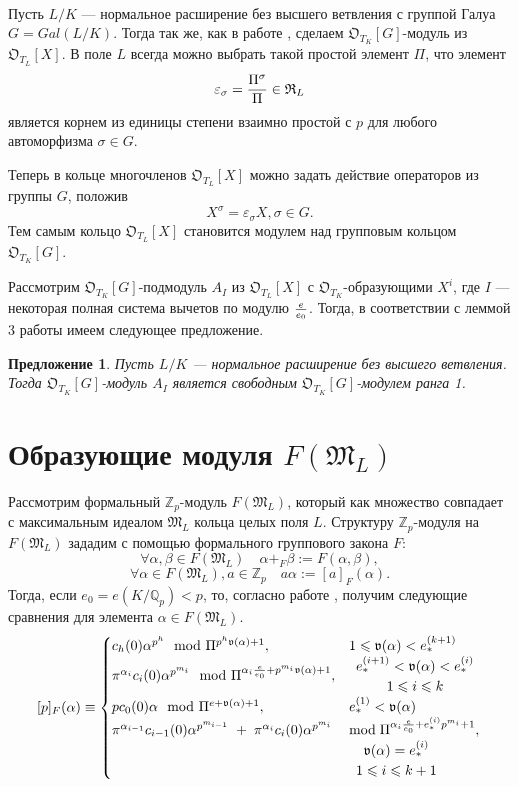 \documentclass[a4paper]{article}
\newcommand{\Qp}{\mathbb{Q}_p}
\newcommand{\ML}{\mathfrak{M}_L}
\newcommand{\OTK}{\mathfrak{O}_{T_K}}
\newcommand{\OTL}{\mathfrak{O}_{T_L}}
\newcommand{\RL}{\mathfrak{R}_L}
\newcommand{\val}{\mathfrak{v}}
\newcommand{\Leq}{\leqslant}
\newtheorem{proposition}{Предложение}
\begin{document}
\paragraph{}

Пусть $L/K$ --- нормальное расширение без высшего ветвления с группой Галуа $G=Gal(L/K)$. Тогда так же, как в работе \cite{book1}, сделаем $\OTK[G]$-модуль из $\OTL[X]$.  В поле $L$ всегда можно выбрать такой простой элемент $\Pi$, что элемент
$$\varepsilon_\sigma={\Pi^\sigma\over\Pi}\in\RL$$
является корнем из единицы степени взаимно простой с $p$ для любого автоморфизма $\sigma \in G$.

Теперь в кольце многочленов $\OTL[X]$ можно задать действие операторов из группы $G$, положив
$$X^\sigma=\varepsilon_\sigma X, \sigma\in G.$$
Тем самым кольцо $\OTL[X]$ становится модулем над групповым кольцом $\OTK[G]$.

Рассмотрим $\OTK[G]$-подмодуль $A_I$ из $\OTL[X]$ с $\OTK$-образующи\-ми $X^i$, где $I$ --- некоторая полная система вычетов по модулю $e\over e_0$. Тогда, в соответствии с леммой 3 работы \cite{book1} имеем следующее предложение.
\begin{proposition}
Пусть $L/K$ --- нормальное расширение без высшего ветвления. Тогда $\OTK[G]$-модуль $A_I$ является свободным \linebreak $\OTK[G]$-модулем ранга 1.
\end{proposition}

\section{Образующие модуля $F(\ML)$}
Рассмотрим формальный $\mathbb{Z}_p$-модуль $F(\ML)$, который как множество совпадает с максимальным идеалом $\ML$ кольца целых поля $L$. Структуру $\mathbb{Z}_p$-модуля на $F(\ML)$ зададим с помощью формального группового закона $F$:
$$\forall\alpha,\beta\in F(\ML) \quad \alpha+_F\beta:=F(\alpha,\beta),$$
$$\forall\alpha\in F(\ML), a\in\mathbb{Z}_p \quad a\alpha:=[a]_F(\alpha).$$
Тогда, если $e_0=e(K/\Qp)<p$, то, согласно работе \cite{book2}, получим следующие сравнения для элемента $\alpha\in F(\ML)$.
$$[p]_F(\alpha)\equiv
  \begin{cases}
  c_h(0)\alpha^{p^h}\mod\Pi^{p^h\val(\alpha)+1},& 1\Leq\val(\alpha)<e_*^{(k+1)} \cr
  \pi^{\alpha_i}c_i(0)\alpha^{p^{m_i}}\mod\Pi^{\alpha_i{e\over e_0}+p^{m_i}\val(\alpha)+1},&
  \begin{array}{c} e_*^{(i+1)}<\val(\alpha)<e_*^{(i)} \\ 1\Leq i\Leq k \\ \end{array}\cr
  pc_0(0)\alpha\mod\Pi^{e+\val(\alpha)+1},& e_*^{(1)}<\val(\alpha) \cr  \pi^{\alpha_{i-1}}c_{i-1}(0)\alpha^{p^{m_{i-1}}}\thickspace+\thickspace\pi^{\alpha_{i}}c_{i}(0)\alpha^{p^{m_{i}}}&\text{mod}\thickspace\Pi^{\alpha_{i}{e\over e_0}+e_*^{(i)}p^{m_{i}}+1},\cr 
  &\begin{array}{c} \val(\alpha)=e_*^{(i)} \\ 1\Leq i\Leq k+1\\ \end{array} \cr
  \end{cases}
$$
\end{document}
